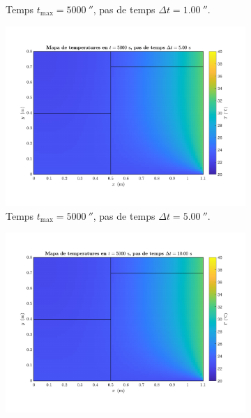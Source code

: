 \begin{figure}[ht]
\begin{subfigure}{.5\textwidth}
		\vspace{-15pt}
		\caption{Temps $t_\text{max} = 5000 \ \second$, pas de temps $\Delta t = 1.00 \ \second$.}
		\label{fig:pas_temps_8}
	\end{subfigure}
	\begin{subfigure}{.5\textwidth}
		\centering
		\includegraphics[width=.95\linewidth]{imagenes/04_analisi_influencia_dades_numeriques/pas_temps/pas_temps_9.pdf}
		\vspace{-15pt}
		\caption{Temps $t_\text{max} = 5000 \ \second$, pas de temps $\Delta t = 5.00 \ \second$.}
		\label{fig:pas_temps_9}
	\end{subfigure}%
	\begin{subfigure}{.5\textwidth}
		\centering
		\includegraphics[width=.95\linewidth]{imagenes/04_analisi_influencia_dades_numeriques/pas_temps/pas_temps_10.pdf}

\end{subfigure}
\end{figure}
